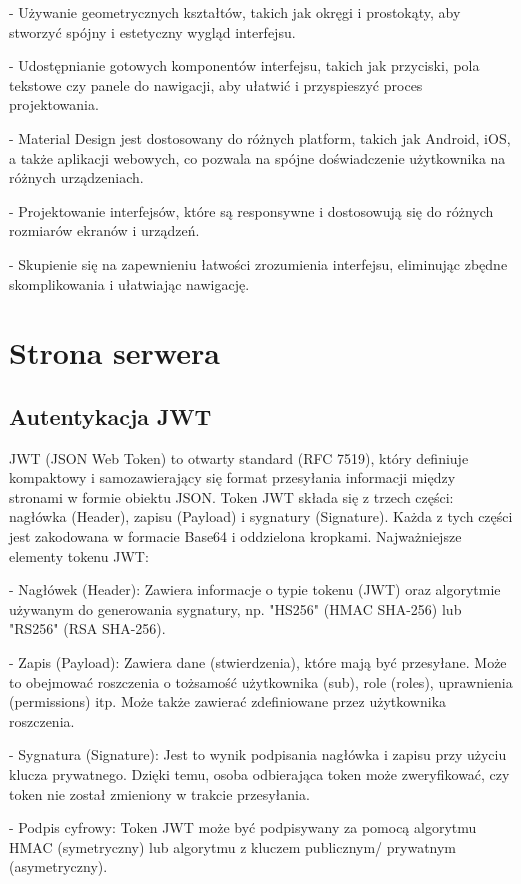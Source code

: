 \documentclass[a4paper,twoside,12pt]{book}
\begin{document}
- Używanie geometrycznych kształtów, takich jak okręgi i prostokąty, aby stworzyć spójny i estetyczny wygląd interfejsu.

- Udostępnianie gotowych komponentów interfejsu, takich jak przyciski, pola tekstowe czy panele do nawigacji, aby ułatwić i przyspieszyć proces projektowania.

- Material Design jest dostosowany do różnych platform, takich jak Android, iOS, a także aplikacji webowych, co pozwala na spójne doświadczenie użytkownika na różnych urządzeniach.

- Projektowanie interfejsów, które są responsywne i dostosowują się do różnych rozmiarów ekranów i urządzeń.

- Skupienie się na zapewnieniu łatwości zrozumienia interfejsu, eliminując zbędne skomplikowania i ułatwiając nawigację.

\section{Strona serwera}
\subsection{Autentykacja JWT}
JWT (JSON Web Token) to otwarty standard (RFC 7519), który definiuje kompaktowy
i samozawierający się format przesyłania informacji między stronami w formie
obiektu JSON. Token JWT składa się z trzech części: nagłówka (Header),
zapisu (Payload) i sygnatury (Signature). Każda z tych części jest zakodowana w
formacie Base64 i oddzielona kropkami. Najważniejsze elementy tokenu JWT:

- Nagłówek (Header):
    Zawiera informacje o typie tokenu (JWT) oraz algorytmie używanym do generowania sygnatury, np. "HS256" (HMAC SHA-256) lub "RS256" (RSA SHA-256).

- Zapis (Payload):
    Zawiera dane (stwierdzenia), które mają być przesyłane. Może to obejmować roszczenia o tożsamość użytkownika (sub), role (roles), uprawnienia (permissions) itp. Może także zawierać zdefiniowane przez użytkownika roszczenia.

- Sygnatura (Signature):
    Jest to wynik podpisania nagłówka i zapisu przy użyciu klucza prywatnego. Dzięki temu, osoba odbierająca token może zweryfikować, czy token nie został zmieniony w trakcie przesyłania.

- Podpis cyfrowy:
    Token JWT może być podpisywany za pomocą algorytmu HMAC (symetryczny) lub algorytmu z kluczem publicznym/ prywatnym (asymetryczny). 
\end{document}
